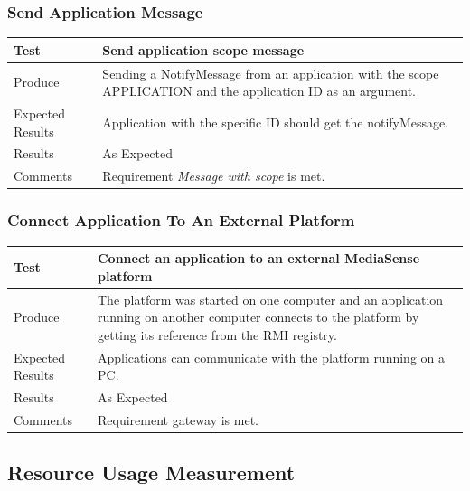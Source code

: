 \subsubsection{Send Application Message}
\begin{center}
    \begin{tabular}{ | l | p{12cm} |}
    \hline
    Test 	 				& 		 Send application scope message\\ \hline
	Produce  				& 		 Sending a NotifyMessage from an application with the scope APPLICATION and the application ID as an argument. \\ \hline
	Expected Results  		& 		 Application with the specific ID should get the notifyMessage. \\ \hline
	Results 				& 		 As Expected\\ \hline
	Comments				& 		 Requirement \emph{Message with scope} is met.\\ \hline
    \end{tabular}
\end{center}

\subsubsection{Connect Application To An External Platform}
\begin{center}
    \begin{tabular}{ | l | p{12cm} |}
    \hline
    Test 	 				& 		 Connect an application to an external MediaSense platform\\ \hline
	Produce  				& 		 The platform was started on one computer and an application running on another computer connects to the platform by getting its reference from the RMI registry.\\ \hline
	Expected Results  		& 		 Applications can communicate with the platform running on a PC. \\ \hline
	Results 				& 		 As Expected\\ \hline
	Comments				& 		 Requirement gateway is met. \\ \hline
    \end{tabular}
\end{center}
\clearpage


\subsection{Resource Usage Measurement}

